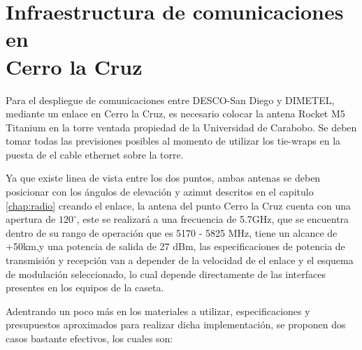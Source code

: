 \documentclass[11pt, a4paper, twosides]{report}
\begin{document}
\chapter{Infraestructura de comunicaciones en\\ Cerro la Cruz}
Para el despliegue de comunicaciones entre DESCO-San Diego y DIMETEL, mediante un enlace en Cerro la Cruz, es necesario colocar la antena Rocket M5 Titanium en la torre ventada propiedad de la Universidad de Carabobo. Se deben tomar todas las previsiones posibles al momento de utilizar los tie-wraps en la puesta de el cable ethernet sobre la torre.

Ya que existe linea de vista entre los dos puntos, ambas antenas se deben posicionar con los ángulos de elevación y azimut descritos en el capitulo \ref{chap:radio} creando el enlace, la antena del punto Cerro la Cruz cuenta con una apertura de $120^{\circ}$, este se realizará a una frecuencia de 5.7GHz, que se encuentra dentro de su rango de operación que es 5170 - 5825 MHz, tiene un alcance de +50km,y una potencia de salida de 27 dBm, las especificaciones de potencia de transmisión y recepción van a depender de la velocidad de el enlace y el esquema de modulación seleccionado, lo cual depende directamente de las interfaces presentes en los equipos de la caseta.

Adentrando un poco más en los materiales a utilizar, especificaciones y presupuestos aproximados para realizar dicha implementación, se proponen dos casos bastante efectivos, los cuales son:
\end{document}
